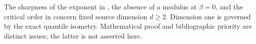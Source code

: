 \documentclass[11pt]{article}
\numberwithin{equation}{section}
\theoremstyle{remark}\newtheorem{remark}[theorem]{Remark}
\begin{document}
The sharpness of the exponent in , the absence of a modulus at $\beta=0$, and the critical order in  concern fixed source dimension $d\ge2$. Dimension one is governed by the exact quantile isometry. Mathematical proof and bibliographic priority are distinct issues; the latter is not asserted here.

\clearpage


\end{document}
